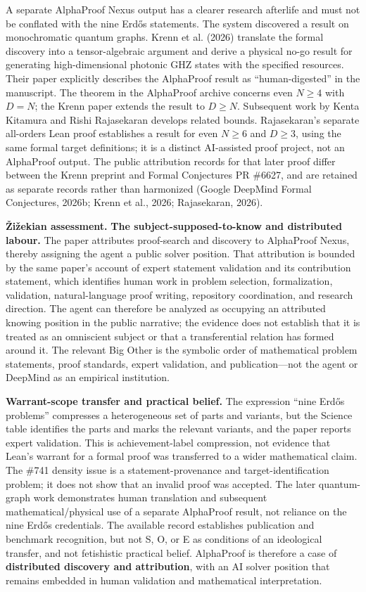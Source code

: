 \documentclass[sn-apa]{sn-jnl}
\begin{document}
A separate AlphaProof Nexus output has a clearer research afterlife and must not be conflated with the nine Erdős statements. The system discovered a result on monochromatic quantum graphs. Krenn et al. (2026) translate the formal discovery into a tensor-algebraic argument and derive a physical no-go result for generating high-dimensional photonic GHZ states with the specified resources. Their paper explicitly describes the AlphaProof result as “human-digested” in the manuscript. The theorem in the AlphaProof archive concerns even \(N\geq4\) with \(D=N\); the Krenn paper extends the result to \(D\geq N\). Subsequent work by Kenta Kitamura and Rishi Rajasekaran develops related bounds. Rajasekaran’s separate all-orders Lean proof establishes a result for even \(N\geq6\) and \(D\geq3\), using the same formal target definitions; it is a distinct AI-assisted proof project, not an AlphaProof output. The public attribution records for that later proof differ between the Krenn preprint and Formal Conjectures PR \#6627, and are retained as separate records rather than harmonized (Google DeepMind Formal Conjectures, 2026b; Krenn et al., 2026; Rajasekaran, 2026).

\textbf{Žižekian assessment.} \textbf{The subject-supposed-to-know and distributed labour.} The paper attributes proof-search and discovery to AlphaProof Nexus, thereby assigning the agent a public solver position. That attribution is bounded by the same paper’s account of expert statement validation and its contribution statement, which identifies human work in problem selection, formalization, validation, natural-language proof writing, repository coordination, and research direction. The agent can therefore be analyzed as occupying an attributed knowing position in the public narrative; the evidence does not establish that it is treated as an omniscient subject or that a transferential relation has formed around it. The relevant Big Other is the symbolic order of mathematical problem statements, proof standards, expert validation, and publication—not the agent or DeepMind as an empirical institution.

\textbf{Warrant-scope transfer and practical belief.} The expression “nine Erdős problems” compresses a heterogeneous set of parts and variants, but the Science table identifies the parts and marks the relevant variants, and the paper reports expert validation. This is achievement-label compression, not evidence that Lean’s warrant for a formal proof was transferred to a wider mathematical claim. The \#741 density issue is a statement-provenance and target-identification problem; it does not show that an invalid proof was accepted. The later quantum-graph work demonstrates human translation and subsequent mathematical/physical use of a separate AlphaProof result, not reliance on the nine Erdős credentials. The available record establishes publication and benchmark recognition, but not S, O, or E as conditions of an ideological transfer, and not fetishistic practical belief. AlphaProof is therefore a case of \textbf{distributed discovery and attribution}, with an AI solver position that remains embedded in human validation and mathematical interpretation.
\end{document}
